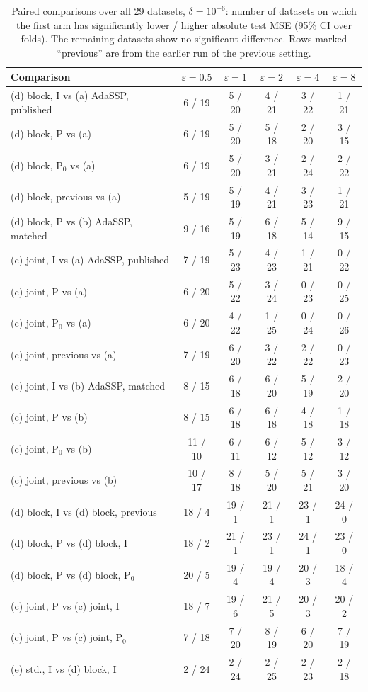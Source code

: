 \documentclass[11pt]{article}
\theoremstyle{definition}
\theoremstyle{plain}
\begin{document}
\begin{table}[t]
  \centering
  \small
  \caption{Paired comparisons over all 29 datasets, $\delta = 10^{-6}$: number of datasets on which the first arm has significantly lower / higher absolute test MSE (95\% CI over folds). The remaining datasets show no significant difference. Rows marked ``previous'' are from the earlier run of the previous setting.}
  \label{tab:verdicts_v31}
  \begin{tabular}{@{}lccccc@{}}
    \toprule
    Comparison & $\varepsilon = 0.5$ & $\varepsilon = 1$ & $\varepsilon = 2$ & $\varepsilon = 4$ & $\varepsilon = 8$ \\
    \midrule
    (d) block, I vs (a) AdaSSP, published & 6 / 19 & 5 / 20 & 4 / 21 & 3 / 22 & 1 / 21 \\
    (d) block, P vs (a) & 6 / 19 & 5 / 20 & 5 / 18 & 2 / 20 & 3 / 15 \\
    (d) block, P$_0$ vs (a) & 6 / 19 & 5 / 20 & 3 / 21 & 2 / 24 & 2 / 22 \\
    (d) block, previous vs (a) & 5 / 19 & 5 / 19 & 4 / 21 & 3 / 23 & 1 / 21 \\
    (d) block, P vs (b) AdaSSP, matched & 9 / 16 & 5 / 19 & 6 / 18 & 5 / 14 & 9 / 15 \\
    \midrule
    (c) joint, I vs (a) AdaSSP, published & 7 / 19 & 5 / 23 & 4 / 23 & 1 / 21 & 0 / 22 \\
    (c) joint, P vs (a) & 6 / 20 & 5 / 22 & 3 / 24 & 0 / 23 & 0 / 25 \\
    (c) joint, P$_0$ vs (a) & 6 / 20 & 4 / 22 & 1 / 25 & 0 / 24 & 0 / 26 \\
    (c) joint, previous vs (a) & 7 / 19 & 6 / 20 & 3 / 22 & 2 / 22 & 0 / 23 \\
    \midrule
    (c) joint, I vs (b) AdaSSP, matched & 8 / 15 & 6 / 18 & 6 / 20 & 5 / 19 & 2 / 20 \\
    (c) joint, P vs (b) & 8 / 15 & 6 / 18 & 6 / 18 & 4 / 18 & 1 / 18 \\
    (c) joint, P$_0$ vs (b) & 11 / 10 & 6 / 11 & 6 / 12 & 5 / 12 & 3 / 12 \\
    (c) joint, previous vs (b) & 10 / 17 & 8 / 18 & 5 / 20 & 5 / 21 & 3 / 20 \\
    \midrule
    (d) block, I vs (d) block, previous & 18 / 4 & 19 / 1 & 21 / 1 & 23 / 1 & 24 / 0 \\
    (d) block, P vs (d) block, I & 18 / 2 & 21 / 1 & 23 / 1 & 24 / 1 & 23 / 0 \\
    (d) block, P vs (d) block, P$_0$ & 20 / 5 & 19 / 4 & 19 / 4 & 20 / 3 & 18 / 4 \\
    (c) joint, P vs (c) joint, I & 18 / 7 & 19 / 6 & 21 / 5 & 20 / 3 & 20 / 2 \\
    (c) joint, P vs (c) joint, P$_0$ & 7 / 18 & 7 / 20 & 8 / 19 & 6 / 20 & 7 / 19 \\
    (e) std., I vs (d) block, I & 2 / 24 & 2 / 24 & 2 / 25 & 2 / 23 & 2 / 18 \\
    \bottomrule
  \end{tabular}
\end{table}
\end{document}
